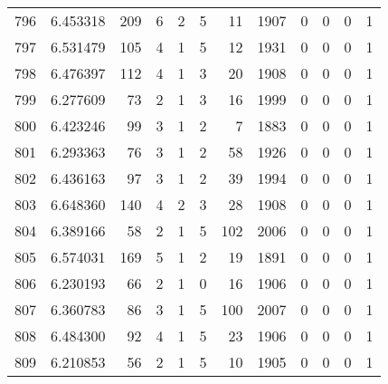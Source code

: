 \begin{tabular}{lrrrrrrrrrrr}
796 &  6.453318 &  209 &      6 &        2 &      5 &              11 &  1907 &               0 &               0 &               0 &               1 \\
797 &  6.531479 &  105 &      4 &        1 &      5 &              12 &  1931 &               0 &               0 &               0 &               1 \\
798 &  6.476397 &  112 &      4 &        1 &      3 &              20 &  1908 &               0 &               0 &               0 &               1 \\
799 &  6.277609 &   73 &      2 &        1 &      3 &              16 &  1999 &               0 &               0 &               0 &               1 \\
800 &  6.423246 &   99 &      3 &        1 &      2 &               7 &  1883 &               0 &               0 &               0 &               1 \\
801 &  6.293363 &   76 &      3 &        1 &      2 &              58 &  1926 &               0 &               0 &               0 &               1 \\
802 &  6.436163 &   97 &      3 &        1 &      2 &              39 &  1994 &               0 &               0 &               0 &               1 \\
803 &  6.648360 &  140 &      4 &        2 &      3 &              28 &  1908 &               0 &               0 &               0 &               1 \\
804 &  6.389166 &   58 &      2 &        1 &      5 &             102 &  2006 &               0 &               0 &               0 &               1 \\
805 &  6.574031 &  169 &      5 &        1 &      2 &              19 &  1891 &               0 &               0 &               0 &               1 \\
806 &  6.230193 &   66 &      2 &        1 &      0 &              16 &  1906 &               0 &               0 &               0 &               1 \\
807 &  6.360783 &   86 &      3 &        1 &      5 &             100 &  2007 &               0 &               0 &               0 &               1 \\
808 &  6.484300 &   92 &      4 &        1 &      5 &              23 &  1906 &               0 &               0 &               0 &               1 \\
809 &  6.210853 &   56 &      2 &        1 &      5 &              10 &  1905 &               0 &               0 &               0 &               1 \\

\end{tabular}
